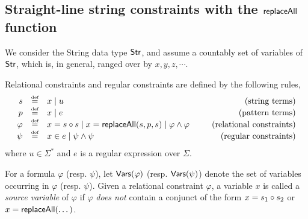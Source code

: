 

\subsection{Straight-line string constraints with the $\mathsf{replaceAll}$ function}


We consider the String data type ${\sf Str}$, and assume a countably set of variables of ${\sf Str}$, which is, in general, ranged over by $x, y, z, \cdots$.  



\begin{definition}
	Relational constraints and regular constraints are defined by the following rules,
	\[
	\begin{array}{r c l cr}
	s &\eqdef & x \mid u & \ \ & \mbox{(string terms)}\\
	p &\eqdef & x \mid e & \ \ & \mbox{(pattern terms)}\\
	\varphi &\eqdef & x = s \concat s  \mid  x = \replaceall(s, p, s) \mid \varphi \wedge \varphi & \ \ & \mbox{(relational constraints)}\\
	\psi & \eqdef & x \in e \mid \psi \wedge \psi %
	& \ \ & \mbox{(regular constraints)} \\
	\end{array}
	\]
	where $u \in \Sigma^\ast$ and $e$ is a regular expression over $\Sigma$. 
	
%	
\end{definition}


For a formula $\varphi$ (resp. $\psi$), let $\mathsf{Vars}(\varphi)$ (resp. $\mathsf{Vars}(\psi)$) denote the set of variables occurring in $\varphi$ (resp. $\psi$). Given a relational constraint $\varphi$, a variable $x$ is called a \emph{source variable} of $\varphi$ if $\varphi$ \emph{does not} contain a conjunct of the form $x = s_1 \circ s_2$ or $x = \mathsf{replaceAll}(\dots)$.

